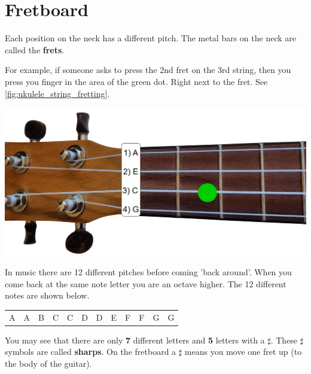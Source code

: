 \section{Fretboard}

\begin{minipage}[b]{0.45\textwidth}
Each position on the neck has a different pitch. The metal bars on the neck are called the \textbf{frets}.

For example, if someone asks to press the 2nd fret on the 3rd string, then you press you finger in the area of the green dot. Right next to the fret. See \autoref{fig:ukulele_string_fretting}.
\end{minipage}
\hfill
\begin{minipage}{0.45\textwidth}
    \centering
    \includegraphics[width=\textwidth]{../../Images/ukulele-neck-fretting.png}
    \label{fig:ukulele_string_fretting}
\end{minipage}

In music there are 12 different pitches before coming 'back around'. When you come back at the same note letter you are an octave higher. The 12 different notes are shown below.

\begin{table}[h]
	\centering
	\begin{tabular}{*{12}{P{5mm}}}
		\large{A} & \large{A\sharp} & \large{B} & \large{C} & \large{C\sharp} & \large{D} & \large{D\sharp} & \large{E} & \large{F} & \large{F\sharp} & \large{G} & \large{G\sharp}
	\end{tabular}
\end{table}

You may see that there are only \textbf{7} different letters and \textbf{5} letters with a \textbf{$\sharp$}. These $\sharp$ symbols are called \textbf{sharps}. On the fretboard a $\sharp$ means you move one fret up (to the body of the guitar).

